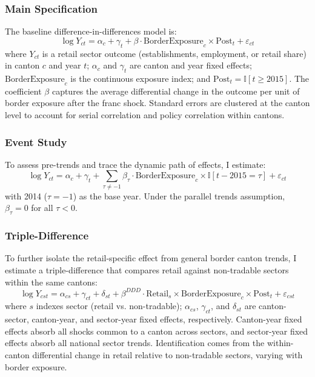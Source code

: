 \documentclass[12pt]{article}
\begin{document}
\subsubsection*{Main Specification} The baseline difference-in-differences model is:
\begin{equation}
\log Y_{ct} = \alpha_c + \gamma_t + \beta \cdot \text{BorderExposure}_c \times \text{Post}_t + \varepsilon_{ct}
\label{eq:did}
\end{equation}
where $Y_{ct}$ is a retail sector outcome (establishments, employment, or retail share) in canton $c$ and year $t$; $\alpha_c$ and $\gamma_t$ are canton and year fixed effects; $\text{BorderExposure}_c$ is the continuous exposure index; and $\text{Post}_t = \mathbb{I}[t \geq 2015]$. The coefficient $\beta$ captures the average differential change in the outcome per unit of border exposure after the franc shock. Standard errors are clustered at the canton level to account for serial correlation and policy correlation within cantons.

\subsubsection*{Event Study} To assess pre-trends and trace the dynamic path of effects, I estimate:
\begin{equation}
\log Y_{ct} = \alpha_c + \gamma_t + \sum_{\tau \neq -1} \beta_\tau \cdot \text{BorderExposure}_c \times \mathbb{I}[t - 2015 = \tau] + \varepsilon_{ct}
\label{eq:event}
\end{equation}
with 2014 ($\tau = -1$) as the base year. Under the parallel trends assumption, $\beta_\tau = 0$ for all $\tau < 0$.

\subsubsection*{Triple-Difference} To further isolate the retail-specific effect from general border canton trends, I estimate a triple-difference that compares retail against non-tradable sectors within the same cantons:
\begin{equation}
\log Y_{cst} = \alpha_{cs} + \gamma_{ct} + \delta_{st} + \beta^{DDD} \cdot \text{Retail}_s \times \text{BorderExposure}_c \times \text{Post}_t + \varepsilon_{cst}
\label{eq:ddd}
\end{equation}
where $s$ indexes sector (retail vs. non-tradable); $\alpha_{cs}$, $\gamma_{ct}$, and $\delta_{st}$ are canton-sector, canton-year, and sector-year fixed effects, respectively. Canton-year fixed effects absorb all shocks common to a canton across sectors, and sector-year fixed effects absorb all national sector trends. Identification comes from the within-canton differential change in retail relative to non-tradable sectors, varying with border exposure.
\end{document}
